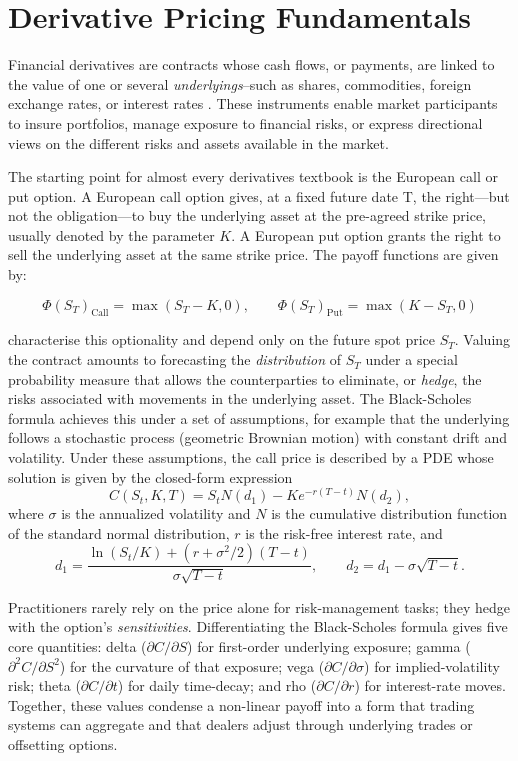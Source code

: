 \documentclass[12pt]{report} %
\theoremstyle{plain} %
\theoremstyle{definition} %
\theoremstyle{remark} %
\begin{document}
\section{Derivative Pricing Fundamentals}\label{sec:derivatives_overview}

Financial derivatives are contracts whose cash flows, or payments, are linked to the value of one
or several \emph{underlyings}--such as shares, commodities, foreign exchange rates, or interest
rates \cite{alma99148840908702021,Wilmott2010PaulWO}. These instruments enable market participants
to insure portfolios, manage exposure to financial risks, or express directional views on the different risks 
and assets available in the market.

The starting point for almost every derivatives textbook is the European call or put option. 
A European call option gives, at a fixed future date T, the right—but not the obligation—to 
buy the underlying asset at the pre-agreed strike price, usually denoted by the parameter $K$. A 
European put option grants the right to sell the underlying asset at the same strike price. The 
payoff functions are given by:

\[\Phi(S_T)_{\text{Call}} = \max(S_T-K,0),\qquad \Phi(S_T)_{\text{Put}} = \max(K-S_T,0) \]

characterise this optionality and depend only on the future spot price \(S_T\). Valuing the
contract amounts to forecasting the \emph{distribution} of \(S_T\) under a special probability
measure that allows the counterparties to eliminate, or \emph{hedge}, the risks associated with
movements in the underlying asset. The Black-Scholes formula achieves this under a set of
assumptions, for example that the underlying follows a stochastic process (geometric Brownian motion) with constant
drift and volatility. Under these assumptions, the call price is described by a PDE whose solution is given by the closed-form
expression
\[
C(S_t,K,T)=S_t N(d_1)-K e^{-r(T-t)} N(d_2),
\]
where $\sigma$ is the annualized volatility and \(N\) is the cumulative distribution function of the standard normal distribution, \(r\) is
the risk-free interest rate, and
\[
d_1=\frac{\ln(S_t/K)+(r+\sigma^2/2)(T-t)}{\sigma\sqrt{T-t}},\qquad
d_2=d_1-\sigma\sqrt{T-t}.
\]

Practitioners rarely rely on the price alone for risk-management tasks; they hedge with the option's
\emph{sensitivities}. Differentiating the Black-Scholes formula gives five core
quantities: delta (\(\partial C/\partial S\)) for first-order underlying exposure; gamma
(\(\partial^2 C/\partial S^2\)) for the curvature of that exposure; vega
(\(\partial C/\partial \sigma\)) for implied-volatility risk; theta
(\(\partial C/\partial t\)) for daily time-decay; and rho
(\(\partial C/\partial r\)) for interest-rate moves. Together, these values condense a
non-linear payoff into a form that trading systems can aggregate and that dealers adjust
through underlying trades or offsetting options.
\end{document}
